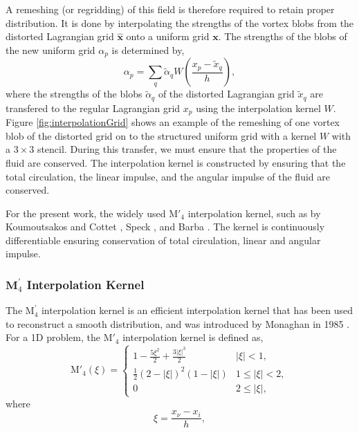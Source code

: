 A remeshing (or regridding) of this field is therefore required to retain proper distribution. It is done by interpolating the strengths of the vortex blobs from the distorted Lagrangian grid $\hat{\mathbf{x}}$ onto a uniform grid $\mathbf{x}$. The strengths of the blobs of the new uniform grid $\alpha_p$ is determined by,
	\begin{equation}
	\alpha_p = \sum_q\tilde{\alpha}_q W \left(\frac{x_p - \tilde{x}_q}{h}\right),
	\label{eq:la_remeshingKernel}
	\end{equation}
where the strengths of the blobs $\tilde{\alpha}_q$ of the distorted Lagrangian grid $\tilde{x}_q$ are transfered to the regular Lagrangian grid $x_p$ using the interpolation kernel $W$. Figure \ref{fig:interpolationGrid} shows an example of the remeshing of one vortex blob of the distorted grid on to the structured uniform grid with a kernel $W$ with a $3\times3$ stencil. During this transfer, we must ensure that the properties of the fluid are conserved. The interpolation kernel is constructed by ensuring that the total circulation, the linear impulse, and the angular impulse of the fluid are conserved. 

For the present work, the widely used $\mathrm{M}'_4$ interpolation kernel, such as by Koumoutsakos and Cottet \cite{Cottet2000a}, Speck \cite{Speck2011a}, and Barba \cite{Barba2004c}. The kernel is continuously differentiable ensuring conservation of total circulation, linear and angular impulse. 

\subsubsection*{$\mathbf{M}^\prime_4$ Interpolation Kernel}

The $\mathrm{M}^{\prime}_4$ interpolation kernel is an efficient interpolation kernel that has been used to reconstruct a smooth distribution, and was introduced by Monaghan in 1985 \cite{Monaghan1985}. For a 1D problem, the $\mathrm{M}'_4$ interpolation kernel is defined as,
	\begin{equation}
	{\mathrm{M'}_4}\left( {\xi} \right) =
	  \begin{cases}
	   {1 - \frac{{5{\xi ^2}}}{2} + \frac{{3{{\left| \xi  \right|}^3}}}{2}} & {\left| \xi \right|} < 1, \\
	   \frac{1}{2}{\left( {2 - \left| \xi  \right|} \right)^2}\left( {1 - \left| \xi  \right|} \right) & 1 \leqslant {\left| \xi \right|} < 2,\\
	   0 & 2 \leqslant \left| \xi \right|,
	  \end{cases}
	\label{eq:interpKernel}
	\end{equation}
where
	\begin{equation}
	\xi = \frac{x_{\nu} - x_i}{h},
	\label{eq:xiEquation}
	\end{equation}
	
